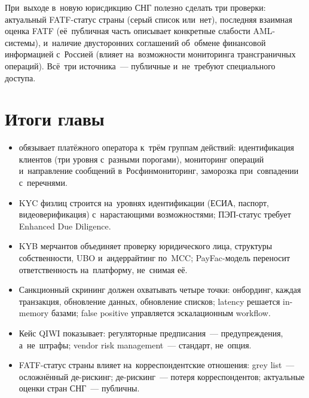 \begin{practice}
  При~выходе в~новую юрисдикцию СНГ полезно сделать три проверки:
  актуальный FATF-статус страны (серый список или~нет), последняя взаимная
  оценка FATF (её~публичная часть описывает конкретные слабости AML-системы),
  и~наличие двусторонних соглашений об~обмене финансовой информацией
  с~Россией (влияет на~возможности мониторинга трансграничных операций).
  Всё~три источника~--- публичные и~не~требуют специального доступа.
\end{practice}


\section*{Итоги главы}

\begin{itemize}
  \item {} обязывает платёжного оператора к~трём группам
        действий: идентификация клиентов (три уровня с~разными порогами),
        мониторинг операций и~направление сообщений в~Росфинмониторинг,
        заморозка при~совпадении с~перечнями.
  \item KYC физлиц строится на~уровнях идентификации (ЕСИА, паспорт,
        видеоверификация) с~нарастающими возможностями; ПЭП-статус
        требует Enhanced Due Diligence.
  \item KYB мерчантов объединяет проверку юридического лица, структуры
        собственности, UBO и~андеррайтинг по~MCC; PayFac-модель переносит
        ответственность на~платформу, не~снимая её.
  \item Санкционный скрининг должен охватывать четыре точки:
        онбординг, каждая транзакция, обновление данных, обновление
        списков; latency решается in-memory базами; false positive
        управляется эскалационным workflow.
  \item Кейс QIWI показывает: регуляторные предписания~--- предупреждения,
        а~не~штрафы; vendor risk management~--- стандарт, не~опция.
  \item FATF-статус страны влияет на~корреспондентские отношения:
        grey list~--- осложнённый де-рискинг; де-рискинг~--- потеря
        корреспондентов; актуальные оценки стран СНГ~--- публичны.
\end{itemize}
